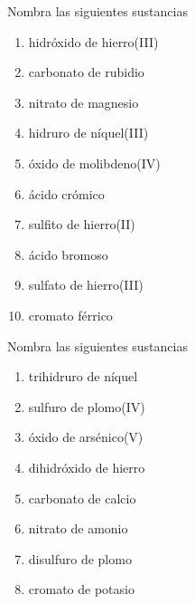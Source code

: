 \documentclass[10pt,a5paper,twoside]{article}
\begin{document}
\begin{exercise}[
    tags    = {inorgánica,formulación,múltiple,2B},
    topics  = {química inorgánica,formulación,nomenclatura},
    source  = {Química 2B SAN 2016, p372, e18},
  ]
  Nombra las siguientes sustancias

  \begin{enumerate}
    \item hidróxido de hierro(III)
    \item carbonato de rubidio
    \item nitrato de magnesio
    \item hidruro de níquel(III)
    \item óxido de molibdeno(IV)
    \item ácido crómico
    \item sulfito de hierro(II)
    \item ácido bromoso
    \item sulfato de hierro(III)
    \item cromato férrico
  \end{enumerate}
\end{exercise}

\begin{solution}
  \begin{enumerate}\begin{multicols}{2}
    \item {}
    \item {}
    \item {}
    \item {}
    \item {}
    \item {}
    \item {}
    \item {}
    \item {}
    \item {}
  \end{multicols}\end{enumerate}
\end{solution}




\begin{exercise}[
    tags    = {inorgánica,formulación,múltiple,2B},
    topics  = {química inorgánica,formulación,nomenclatura},
    source  = {Química 2B SAN 2016, p372, e19},
  ]
  Nombra las siguientes sustancias

  \begin{enumerate}
    \item trihidruro de níquel
    \item sulfuro de plomo(IV)
    \item óxido de arsénico(V)
    \item dihidróxido de hierro
    \item carbonato de calcio
    \item nitrato de amonio
    \item disulfuro de plomo
    \item cromato de potasio
  \end{enumerate}
\end{exercise}
\end{document}
